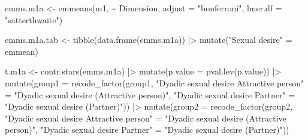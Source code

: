 \documentclass[
  bookmarksnumbered]{article}
\newenvironment{Shaded}{\begin{snugshade}}{\end{snugshade}}
\newcommand{\AttributeTok}[1]{\textcolor[rgb]{0.80,0.80,0.80}{#1}}
\newcommand{\FunctionTok}[1]{\textcolor[rgb]{0.94,0.94,0.56}{#1}}
\newcommand{\NormalTok}[1]{\textcolor[rgb]{0.80,0.80,0.80}{#1}}
\newcommand{\OtherTok}[1]{\textcolor[rgb]{0.94,0.94,0.56}{#1}}
\newcommand{\SpecialCharTok}[1]{\textcolor[rgb]{0.86,0.64,0.64}{#1}}
\newcommand{\StringTok}[1]{\textcolor[rgb]{0.80,0.58,0.58}{#1}}
\begin{document}
\begin{Shaded}
\begin{Highlighting}[]
\NormalTok{emms.m1a }\OtherTok{\textless{}{-}} \FunctionTok{emmeans}\NormalTok{(m1, }\SpecialCharTok{\textasciitilde{}}\NormalTok{ Dimension,}
                    \AttributeTok{adjust =} \StringTok{"bonferroni"}\NormalTok{,}
                    \AttributeTok{lmer.df =} \StringTok{"satterthwaite"}\NormalTok{)}

\NormalTok{emms.m1a.tab }\OtherTok{\textless{}{-}} \FunctionTok{tibble}\NormalTok{(}\FunctionTok{data.frame}\NormalTok{(emms.m1a)) }\SpecialCharTok{|\textgreater{}}
  \FunctionTok{mutate}\NormalTok{(}\StringTok{"Sexual desire"} \OtherTok{=}\NormalTok{ emmean)}

\NormalTok{t.m1a }\OtherTok{\textless{}{-}} \FunctionTok{contr.stars}\NormalTok{(emms.m1a) }\SpecialCharTok{|\textgreater{}} 
  \FunctionTok{mutate}\NormalTok{(}\AttributeTok{p.value =} \FunctionTok{pval.lev}\NormalTok{(p.value)) }\SpecialCharTok{|\textgreater{}}
  \FunctionTok{mutate}\NormalTok{(}\AttributeTok{group1 =} \FunctionTok{recode\_factor}\NormalTok{(group1,}
                                \StringTok{"Dyadic sexual desire Attractive person"} \OtherTok{=} 
                                  \StringTok{"Dyadic sexual desire (Attractive person)"}\NormalTok{,}
                                \StringTok{"Dyadic sexual desire Partner"} \OtherTok{=} 
                                  \StringTok{"Dyadic sexual desire (Partner)"}\NormalTok{)) }\SpecialCharTok{|\textgreater{}}
  \FunctionTok{mutate}\NormalTok{(}\AttributeTok{group2 =} \FunctionTok{recode\_factor}\NormalTok{(group2,}
                                \StringTok{"Dyadic sexual desire Attractive person"} \OtherTok{=} 
                                  \StringTok{"Dyadic sexual desire (Attractive person)"}\NormalTok{,}
                                \StringTok{"Dyadic sexual desire Partner"} \OtherTok{=} 
                                  \StringTok{"Dyadic sexual desire (Partner)"}\NormalTok{))}


\end{Highlighting}
\end{Shaded}
\end{document}
